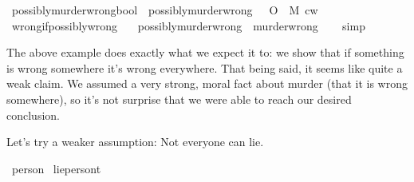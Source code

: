 \begin{isabellebody}
%
\isadelimproof
%
\endisadelimproof
%
\isatagproof
%
\endisatagproof
{\isafoldproof}%
%
\isadelimproof
\isanewline
%
\endisadelimproof
{}\isamarkupfalse%
\ possibly{\isacharunderscore}murder{\isacharunderscore}wrong{\isacharcolon}{\isacharcolon}{\isachardoublequoteopen}bool{\isachardoublequoteclose}\ \ {\isachardoublequoteopen}possibly{\isacharunderscore}murder{\isacharunderscore}wrong\ {\isasymequiv}\ {\isacharparenleft}{\isasymdiamond}\ {\isacharparenleft}O\ {\isacharbraceleft}\isactrlbold {\isasymnot}\ M{\isacharbraceright}{\isacharparenright}{\isacharparenright}\ cw{\isachardoublequoteclose}\isanewline
%
\isanewline
\isanewline
{}\isamarkupfalse%
\ wrong{\isacharunderscore}if{\isacharunderscore}possibly{\isacharunderscore}wrong{\isacharcolon}\isanewline
\ \ \ {\isachardoublequoteopen}possibly{\isacharunderscore}murder{\isacharunderscore}wrong\ {\isasymlongrightarrow}\ murder{\isacharunderscore}wrong{\isachardoublequoteclose}\isanewline
%
\isadelimproof
\ \ %
\endisadelimproof
%
\isatagproof
{}\isamarkupfalse%
\ simp\isanewline
%
%
\endisatagproof
{\isafoldproof}%
%
\isadelimproof
%
\endisadelimproof
%
\begin{isamarkuptext}%
The above example does exactly what we expect it to: we show that if something is wrong somewhere 
it's wrong everywhere. That being said, it seems like quite a weak claim. We assumed a very strong, moral 
fact about murder (that it is wrong somewhere), so it's not surprise that we were able to reach our desired conclusion.%
\end{isamarkuptext}\isamarkuptrue%
%
\begin{isamarkuptext}%
Let's try a weaker assumption: Not everyone can lie.%
\end{isamarkuptext}\isamarkuptrue%
\isamarkupfalse%
\ person\isanewline
{}\isamarkupfalse%
\ lie{\isacharcolon}{\isacharcolon}{\isachardoublequoteopen}person{\isasymRightarrow}t{\isachardoublequoteclose}\isanewline

\end{isabellebody}
